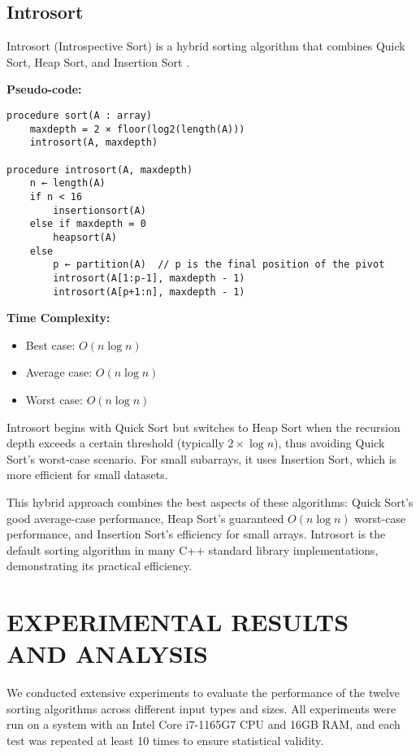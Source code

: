 \documentclass[sigconf]{acmart}
\begin{document}
\subsection{Introsort}
Introsort (Introspective Sort) is a hybrid sorting algorithm that combines Quick Sort, Heap Sort, and Insertion Sort \cite{introsort, musser1997introspective}.

\textbf{Pseudo-code:}
\begin{verbatim}
procedure sort(A : array)
    maxdepth = 2 × floor(log2(length(A)))
    introsort(A, maxdepth)
    
procedure introsort(A, maxdepth)
    n ← length(A)
    if n < 16
        insertionsort(A)
    else if maxdepth = 0
        heapsort(A)
    else
        p ← partition(A)  // p is the final position of the pivot
        introsort(A[1:p-1], maxdepth - 1)
        introsort(A[p+1:n], maxdepth - 1)
\end{verbatim}

\textbf{Time Complexity:}
\begin{itemize}
    \item Best case: $O(n \log n)$
    \item Average case: $O(n \log n)$
    \item Worst case: $O(n \log n)$
\end{itemize}

Introsort begins with Quick Sort but switches to Heap Sort when the recursion depth exceeds a certain threshold (typically $2 \times \log n$), thus avoiding Quick Sort's worst-case scenario. For small subarrays, it uses Insertion Sort, which is more efficient for small datasets.

This hybrid approach combines the best aspects of these algorithms: Quick Sort's good average-case performance, Heap Sort's guaranteed $O(n \log n)$ worst-case performance, and Insertion Sort's efficiency for small arrays. Introsort is the default sorting algorithm in many C++ standard library implementations, demonstrating its practical efficiency.

\section{EXPERIMENTAL RESULTS AND ANALYSIS}
We conducted extensive experiments to evaluate the performance of the twelve sorting algorithms across different input types and sizes. All experiments were run on a system with an Intel Core i7-1165G7 CPU and 16GB RAM, and each test was repeated at least 10 times to ensure statistical validity.
\end{document}
